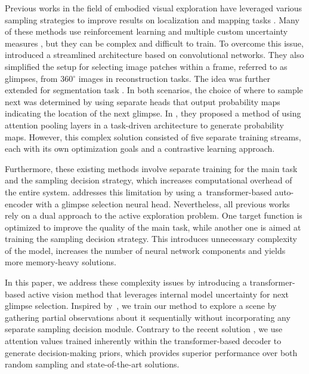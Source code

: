 \documentclass{article}
\begin{document}
Previous works in the field of embodied visual exploration have leveraged various sampling strategies to improve results on localization and mapping tasks \cite{Ramakrishnan2021AnEO}. Many of these methods use reinforcement learning \cite{ramakrishnan2018rl3} and multiple custom uncertainty measures \cite{Ramakrishnan2021AnEO}, but they can be complex and difficult to train. To overcome this issue, \cite{seifi2019wheretolooknext} introduced a streamlined architecture based on convolutional networks. They also simplified the setup for selecting image patches within a frame, referred to as glimpses, from 360$^{\circ}$ images in reconstruction tasks. The idea was further extended for segmentation task \cite{seifi2020segment}. %
In both scenarios, the choice of where to sample next was determined by using separate heads that output probability maps indicating the location of the next glimpse. In \cite{seifi2021glimpse}, they proposed a method of using attention pooling layers in a task-driven architecture to generate probability maps. However, this complex solution consisted of five separate training streams, each with its own optimization goals and a contrastive learning approach.

Furthermore, these existing methods involve separate training for the main task and the sampling decision strategy, which increases computational overhead of the entire system. \cite{Jha2023WACV} addresses this limitation by using a~transformer-based auto-encoder with a glimpse selection neural head. %
Nevertheless, all previous works rely on a dual approach to the active exploration problem. One target function is optimized to improve the quality of the main task, while another one is aimed at training the sampling decision strategy. This introduces unnecessary complexity of the model, increases the number of neural network components and yields more memory-heavy solutions.

In this paper, we address these complexity issues by introducing a transformer-based active vision method that leverages internal model uncertainty for next glimpse selection. Inspired by~\cite{Aloimonos1988}, we train our method to explore a scene by gathering partial observations about it sequentially without incorporating any separate sampling decision module. %
Contrary to the recent solution \cite{Jha2023WACV}, we use attention values trained inherently within the transformer-based decoder to generate decision-making priors, which provides superior performance over both random sampling and state-of-the-art solutions.
\end{document}
